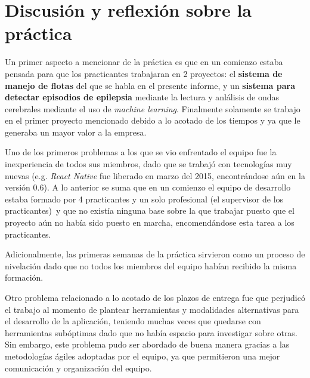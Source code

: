 \section{Discusión y reflexión sobre la práctica}
  Un primer aspecto a mencionar de la práctica es que en un comienzo estaba pensada para
  que los practicantes trabajaran en 2 proyectos: el \textbf{sistema de manejo de flotas} 
  del que se habla en el presente informe, y un \textbf{sistema para detectar episodios de 
  epilepsia} mediante la lectura y anlálisis de ondas cerebrales mediante el uso de 
  \textit{machine learning}.
  Finalmente solamente se trabajo en el primer proyecto mencionado debido a lo acotado de
  los tiempos y ya que le generaba un mayor valor a la empresa.

  Uno de los primeros problemas a los que se vio enfrentado el equipo fue la inexperiencia
  de todos sus miembros, dado que se trabajó con tecnologías muy nuevas (e.g. 
  \textit{React Native} fue liberado en marzo del 2015, encontrándose aún en la versión 
  0.6).
  A lo anterior se suma que en un comienzo el equipo de desarrollo estaba formado por 4 
  practicantes y un solo profesional (el supervisor de los practicantes)\footnotemark\ y 
  que no existía ninguna base sobre la que trabajar puesto que el proyecto aún no había 
  sido puesto en marcha, encomendándose esta tarea a los practicantes.

  Adicionalmente, las primeras semanas de la práctica sirvieron como un proceso de 
  nivelación dado que no todos los miembros del equipo habían recibido la misma formación.

  Otro problema relacionado a lo acotado de los plazos de entrega fue que perjudicó el 
  trabajo al momento de plantear herramientas y modalidades alternativas para el 
  desarrollo de la aplicación, teniendo muchas veces que quedarse con herramientas 
  subóptimas dado que no había espacio para investigar sobre otras.
  Sin embargo, este problema pudo ser abordado de buena manera gracias a las metodologías
  ágiles adoptadas por el equipo, ya que permitieron una mejor comunicación y organización
  del equipo.

